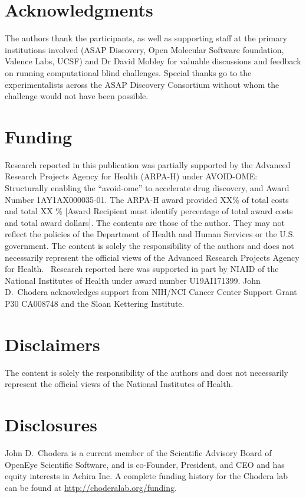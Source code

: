 \documentclass[journal=jcim,manuscript=article]{achemso}
\begin{document}
\section{Acknowledgments}

The authors thank the participants, as well as supporting staff at the primary institutions involved (ASAP Discovery, Open Molecular Software foundation, Valence Labs, UCSF) and Dr David Mobley for valuable discussions and feedback on running computational blind challenges. Special thanks go to the experimentalists across the ASAP Discovery Consortium without whom the challenge would not have been possible. 

\section{Funding}

Research reported in this publication was partially supported by the Advanced Research Projects Agency for Health (ARPA-H) under AVOID-OME: Structurally enabling the “avoid-ome” to accelerate drug discovery, and Award Number 1AY1AX000035-01. The ARPA-H award provided XX\% of total costs and total XX \% [Award Recipient must identify percentage of total award costs and total award dollars]. The contents are those of the author. They may not reflect the policies of the Department of Health and Human Services or the U.S. government. The content is solely the responsibility of the authors and does not necessarily represent the official views of the Advanced Research Projects Agency for Health.\
Research reported here was supported in part by NIAID of the National Institutes of Health under award number U19AI171399.
John D.\ Chodera acknowledges support from NIH/NCI Cancer Center Support Grant P30 CA008748 and the Sloan Kettering Institute.

\section{Disclaimers}
The content is solely the responsibility of the authors and does not necessarily represent the official views of the National Institutes of Health.

\section{Disclosures}
John D.\ Chodera is a current member of the Scientific Advisory Board of OpenEye Scientific Software, and is co-Founder, President, and CEO and has equity interests in Achira Inc.
A complete funding history for the Chodera lab can be found at \url{http://choderalab.org/funding}.
\end{document}
